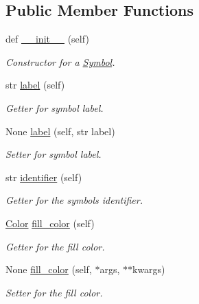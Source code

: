\subsection*{Public Member Functions}
\begin{DoxyCompactItemize}
\item 
def \mbox{\hyperlink{classbridges_1_1symbol_1_1_symbol_a57c7fcd41baccb9c2e15c9c828d957f6}{\+\_\+\+\_\+init\+\_\+\+\_\+}} (self)
\begin{DoxyCompactList}\small\item\em Constructor for a \mbox{\hyperlink{classbridges_1_1symbol_1_1_symbol}{Symbol}}. \end{DoxyCompactList}\item 
str \mbox{\hyperlink{classbridges_1_1symbol_1_1_symbol_a94be85f7ec433b5ac577ca12753fa911}{label}} (self)
\begin{DoxyCompactList}\small\item\em Getter for symbol label. \end{DoxyCompactList}\item 
None \mbox{\hyperlink{classbridges_1_1symbol_1_1_symbol_a615f9ccca959c3f4b528c75df96104d5}{label}} (self, str label)
\begin{DoxyCompactList}\small\item\em Setter for symbol label. \end{DoxyCompactList}\item 
str \mbox{\hyperlink{classbridges_1_1symbol_1_1_symbol_a84683c105c53b4a35e7444f7c2a6064d}{identifier}} (self)
\begin{DoxyCompactList}\small\item\em Getter for the symbols identifier. \end{DoxyCompactList}\item 
\mbox{\hyperlink{classbridges_1_1color_1_1_color}{Color}} \mbox{\hyperlink{classbridges_1_1symbol_1_1_symbol_a6e33002ba21999d6858f6082fb510185}{fill\+\_\+color}} (self)
\begin{DoxyCompactList}\small\item\em Getter for the fill color. \end{DoxyCompactList}\item 
None \mbox{\hyperlink{classbridges_1_1symbol_1_1_symbol_a8b48b9062b234cb293e6915f9d801f68}{fill\+\_\+color}} (self, $\ast$args, $\ast$$\ast$kwargs)
\begin{DoxyCompactList}\small\item\em Setter for the fill color. \end{DoxyCompactList}\item 
$$
\end{DoxyCompactItemize}
